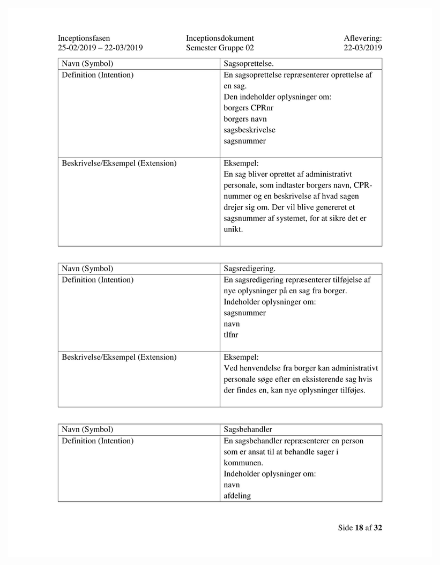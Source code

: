 \begin{figure}[hb]
  \includegraphics[scale = 0.33]{./PNG/Inceptions/Gruppe 02 + InceptionsDokument-19.jpg} 
\end{figure}

